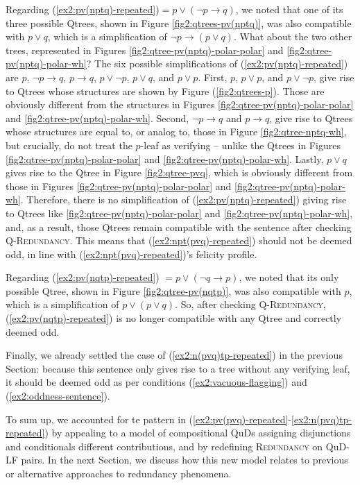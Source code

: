 Regarding (\ref{ex2:pv(nptq)-repeated})$ = p\vee(\neg p \rightarrow q)$, we noted that one of its three possible Qtrees, shown in Figure \ref{fig2:qtrees-pv(nptq)}, was also compatible with $p \vee q$, which is a simplification of $\neg p\rightarrow(p \vee q)$. What about the two other trees, represented in Figures \ref{fig2:qtree-pv(nptq)-polar-polar} and \ref{fig2:qtree-pv(nptq)-polar-wh}? The six possible simplifications of (\ref{ex2:pv(nptq)-repeated}) are $p$, $\neg p \rightarrow q$, $p \rightarrow q$, $p \vee \neg p$, $p \vee q$, and $p \vee p$. First, $p$, $p \vee p$, and $p \vee \neg p$, give rise to Qtrees whose structures are shown by Figure (\ref{fig2:qtrees-p}). Those are obviously different from the structures in Figures \ref{fig2:qtree-pv(nptq)-polar-polar} and \ref{fig2:qtree-pv(nptq)-polar-wh}. Second, $\neg p \rightarrow q$ and $p \rightarrow q$, give rise to Qtrees whose structures are equal to, or analog to, those in Figure \ref{fig2:qtree-nptq-wh}, but crucially, do not treat the $p$-leaf as verifying -- unlike the Qtrees in Figures \ref{fig2:qtree-pv(nptq)-polar-polar} and \ref{fig2:qtree-pv(nptq)-polar-wh}. Lastly, $p \vee q$ gives rise to the Qtree in Figure \ref{fig2:qtree-pvq}, which is obviously different from those in Figures \ref{fig2:qtree-pv(nptq)-polar-polar} and \ref{fig2:qtree-pv(nptq)-polar-wh}. Therefore, there is no simplification of (\ref{ex2:pv(nptq)-repeated}) giving rise to Qtrees like \ref{fig2:qtree-pv(nptq)-polar-polar} and \ref{fig2:qtree-pv(nptq)-polar-wh}, and, as a result, those Qtrees remain compatible with the sentence after checking \textsc{Q-Redundancy}. This means that (\ref{ex2:npt(pvq)-repeated}) should not be deemed odd, in line with (\ref{ex2:npt(pvq)-repeated})'s felicity profile.

Regarding (\ref{ex2:pv(nqtp)-repeated}) $ = p \vee (\neg q \rightarrow p)$, we noted that its only possible Qtree, shown in Figure \ref{fig2:qtree-pv(nqtp)}, was also compatible with $p$, which is a simplification of $p\vee(p \vee q)$. So, after checking \textsc{Q-Redundancy}, (\ref{ex2:pv(nqtp)-repeated}) is no longer compatible with any Qtree and correctly deemed odd.

Finally, we already settled the case of (\ref{ex2:n(pvq)tp-repeated}) in the previous Section: because this sentence only gives rise to a tree without any verifying leaf, it should be deemed odd as per conditions (\ref{ex2:vacuous-flagging}) and (\ref{ex2:oddness-sentence}).

To sum up, we accounted for te pattern in (\ref{ex2:pv(pvq)-repeated}-\ref{ex2:n(pvq)tp-repeated}) by appealing to a model of compositional QuDs assigning disjunctions and conditionals different contributions, and by redefining \textsc{Redundancy} on QuD-LF pairs. In the next Section, we discuss how this new model relates to previous or alternative approaches to redundancy phenomena.


